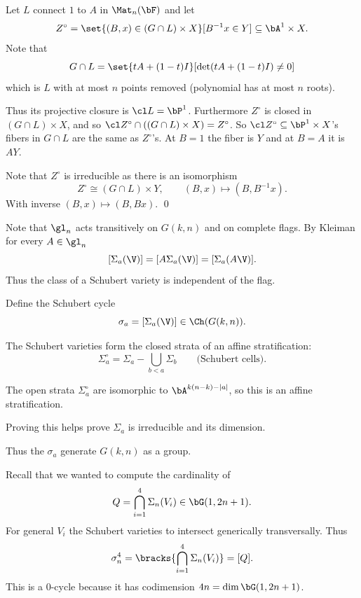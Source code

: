 \ethrm

\bproof

    Let $L$ connect $1$ to $A$ in $\Mat_n(\bF)$ and let
    $$ Z^\circ = \set{(B,x)\in(G\cap L)\times X}[B^{-1}x\in Y] \subseteq \bA^1\times X . $$
    Note that
    $$ G\cap L = \set{tA+(1-t)I}[\det(tA+(1-t)I)\neq0] $$
    which is $L$ with at most $n$ points removed (polynomial has at most $n$ roots).

    Thus its projective closure is $\cl L=\bP^1$.
    Furthermore $Z^\circ$ is closed in $(G\cap L)\times X$, and so $\cl Z^\circ\cap((G\cap L)\times X)=Z^\circ$.
    So $\cl Z^\circ\subseteq\bP^1\times X$'s fibers in $G\cap L$ are the same as $Z^\circ$'s.
    At $B=1$ the fiber is $Y$ and at $B=A$ it is $AY$.

    Note that $Z^\circ$ is irreducible as there is an isomorphism
    $$ Z^\circ \cong (G\cap L)\times Y,\qquad (B,x) \mapsto (B,B^{-1}x) . $$
    With inverse $(B,x)\mapsto(B,Bx)$.
    \qed

\eproof

Note that $\gl_n$ acts transitively on $G(k,n)$ and on complete flags.
By Kleiman for every $A\in\gl_n$
$$ [\Sigma_a(\V)] = [A\Sigma_a(\V)] = [\Sigma_a(A\V)] . $$
Thus the class of a Schubert variety is independent of the flag.

Define the {\emphcolor Schubert cycle}
$$ \sigma_a = [\Sigma_a(\V)] \in \Ch(G(k,n)) . $$

The Schubert varieties form the closed strata of an affine stratification:
$$ \Sigma_a^\circ = \Sigma_a - \bigcup_{b<a}\Sigma_b \qquad\text{(Schubert cells)} . $$

\bprop

    The open strata $\Sigma_a^\circ$ are isomorphic to $\bA^{k(n-k)-\abs a}$, so this is an affine stratification.

\eprop

\blnote

    Proving this helps prove $\Sigma_a$ is irreducible and its dimension.

\elnote

Thus the $\sigma_a$ generate $G(k,n)$ as a group.

\bremark

    Recall that we wanted to compute the cardinality of
    $$ Q = \bigcap_{i=1}^4\Sigma_n(V_i) \in \bG(1,2n+1) . $$
    For general $V_i$ the Schubert varieties to intersect generically transversally.
    Thus
    $$ \sigma_n^4 = \bracks{\bigcap_{i=1}^4\Sigma_n(V_i)} = [Q] . $$
    This is a $0$-cycle because it has codimension $4n=\dim\bG(1,2n+1)$.

